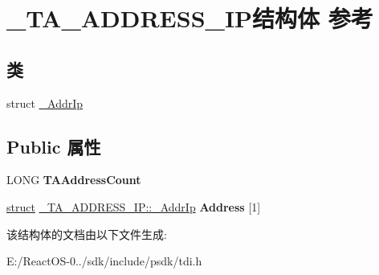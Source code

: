 \hypertarget{struct___t_a___a_d_d_r_e_s_s___i_p}{}\section{\+\_\+\+T\+A\+\_\+\+A\+D\+D\+R\+E\+S\+S\+\_\+\+I\+P结构体 参考}
\label{struct___t_a___a_d_d_r_e_s_s___i_p}
\subsection*{类}
\begin{DoxyCompactItemize}
\item 
struct \hyperlink{struct___t_a___a_d_d_r_e_s_s___i_p_1_1___addr_ip}{\+\_\+\+Addr\+Ip}
\end{DoxyCompactItemize}
\subsection*{Public 属性}
\begin{DoxyCompactItemize}
\item 
\mbox{\label{struct___t_a___a_d_d_r_e_s_s___i_p_acbfadc5f70425e8b89a00d72030bba53}} 
L\+O\+NG {\bfseries T\+A\+Address\+Count}
\item 
\mbox{\label{struct___t_a___a_d_d_r_e_s_s___i_p_ae3402fa9978168fe1eb8214d950e326f}} 
\hyperlink{interfacestruct}{struct} \hyperlink{struct___t_a___a_d_d_r_e_s_s___i_p_1_1___addr_ip}{\+\_\+\+T\+A\+\_\+\+A\+D\+D\+R\+E\+S\+S\+\_\+\+I\+P\+::\+\_\+\+Addr\+Ip} {\bfseries Address} \mbox{[}1\mbox{]}
\end{DoxyCompactItemize}


该结构体的文档由以下文件生成\+:\begin{DoxyCompactItemize}
\item 
E\+:/\+React\+O\+S-\/0../sdk/include/psdk/tdi.\+h\end{DoxyCompactItemize}
